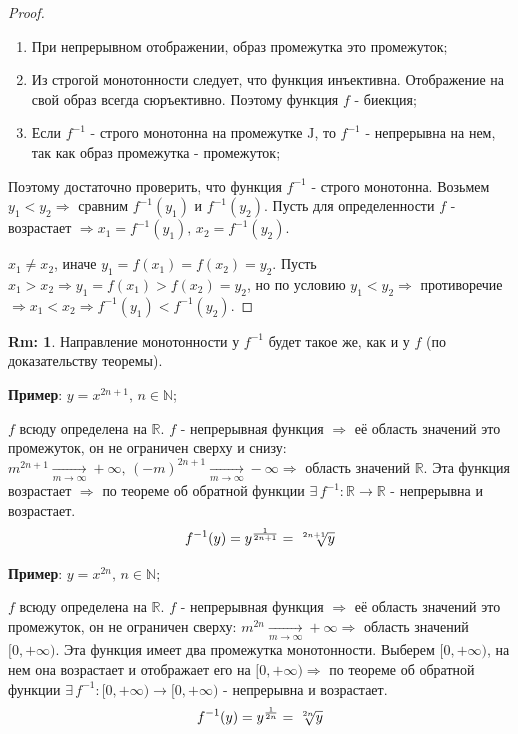 \documentclass[12pt]{article}
\newcommand{\MR}{\mathbb{R}}
\newcommand{\MJ}{\mathrm{J}}
\theoremstyle{definition}
\newtheorem{rem}{Rm:}
\begin{document}
\begin{proof}\hfill
	\begin{enumerate}[label={\arabic*)}]
		\item При непрерывном отображении, образ промежутка это промежуток;
		\item Из строгой монотонности следует, что функция инъективна. Отображение на свой образ всегда сюръективно. Поэтому функция $f$ - биекция;
		\item Если $f^{-1}$ - строго монотонна на промежутке $\MJ$, то $f^{-1}$ - непрерывна на нем, так как образ промежутка - промежуток;
	\end{enumerate}
	Поэтому достаточно проверить, что функция $f^{-1}$ - строго монотонна. Возьмем $y_1 < y_2 \Rightarrow$ сравним $f^{-1}(y_1)$ и $f^{-1}(y_2)$. Пусть для определенности $f$ - возрастает $\Rightarrow x_1 = f^{-1}(y_1), \, x_2 = f^{-1}(y_2)$.
	
	$x_1 \neq x_2$, иначе $y_1 = f(x_1) = f(x_2) = y_2$. Пусть $x_1 > x_2 \Rightarrow y_1 = f(x_1) > f(x_2) = y_2$, но по условию $y_1 < y_2 \Rightarrow$ противоречие $\Rightarrow x_1 < x_2 \Rightarrow f^{-1}(y_1) < f^{-1}(y_2)$.
\end{proof}

\begin{rem}
	Направление монотонности у $f^{-1}$ будет такое же, как и у $f$ (по доказательству теоремы).
\end{rem}

\textbf{Пример}: $y = x^{2n+1}, \, n \in \mathbb{N}$; 

$f$ всюду определена на $\MR$. $f$ - непрерывная функция $\Rightarrow$ её область значений это промежуток, он не ограничен сверху и снизу: $m^{2n+1} \xrightarrow[m\to \infty]{} +\infty, \, (-m)^{2n+1} \xrightarrow[m\to \infty]{} -\infty \Rightarrow$ область значений $\MR$. Эта функция возрастает $\Rightarrow$ по теореме об обратной функции $\exists \, f^{-1} \colon \MR \to \MR$ - непрерывна и возрастает. $$f^{-1}(y) = y^{\frac{1}{2n+1}} = \sqrt[\leftroot{-2}\uproot{2}{2n+1}]{y}$$

\textbf{Пример}: $y = x^{2n}, \, n \in \mathbb{N}$; 

$f$ всюду определена на $\MR$. $f$ - непрерывная функция $\Rightarrow$ её область значений это промежуток, он не ограничен сверху: $m^{2n} \xrightarrow[m\to \infty]{} +\infty \Rightarrow$ область значений $[0, +\infty)$. Эта функция имеет два промежутка монотонности. Выберем $[0, +\infty)$, на нем она возрастает и отображает его на $[0, +\infty) \Rightarrow$ по теореме об обратной функции $\exists \, f^{-1} \colon [0, +\infty) \to [0, +\infty)$ - непрерывна и возрастает. $$f^{-1}(y) = y^{\frac{1}{2n}} = \sqrt[\leftroot{-2}\uproot{2}{2n}]{y}$$
\end{document}
